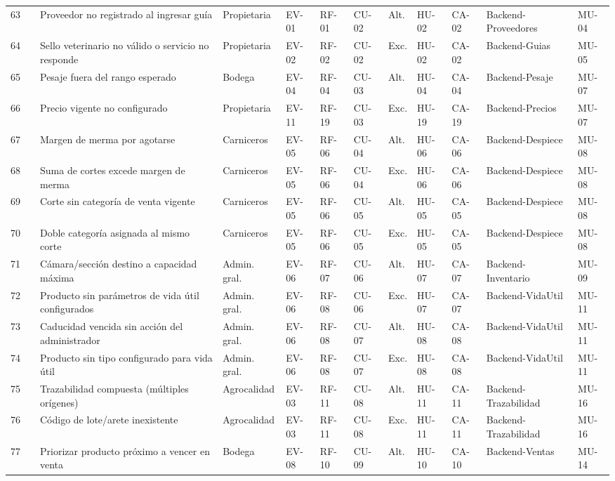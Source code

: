 \documentclass[11pt,a4paper]{article}
\begin{document}
\begin{longtable}{|p{0.3cm}|p{1.0cm}|p{1.9cm}|p{1.3cm}|p{0.6cm}|p{0.7cm}|p{0.6cm}|p{1.1cm}|p{0.6cm}|p{0.6cm}|p{2.0cm}|p{0.8cm}|}
63 &  & Proveedor no registrado al ingresar guía & Propietaria & EV-01 & RF-01 & CU-02 & Alt. & HU-02 & CA-02 & Backend-Proveedores & MU-04 \\
64 &  & Sello veterinario no válido o servicio no responde & Propietaria & EV-02 & RF-02 & CU-02 & Exc. & HU-02 & CA-02 & Backend-Guias & MU-05 \\
65 &  & Pesaje fuera del rango esperado & Bodega & EV-04 & RF-04 & CU-03 & Alt. & HU-04 & CA-04 & Backend-Pesaje & MU-07 \\
66 &  & Precio vigente no configurado & Propietaria & EV-11 & RF-19 & CU-03 & Exc. & HU-19 & CA-19 & Backend-Precios & MU-07 \\
67 &  & Margen de merma por agotarse & Carniceros & EV-05 & RF-06 & CU-04 & Alt. & HU-06 & CA-06 & Backend-Despiece & MU-08 \\
68 &  & Suma de cortes excede margen de merma & Carniceros & EV-05 & RF-06 & CU-04 & Exc. & HU-06 & CA-06 & Backend-Despiece & MU-08 \\
69 &  & Corte sin categoría de venta vigente & Carniceros & EV-05 & RF-06 & CU-05 & Alt. & HU-05 & CA-05 & Backend-Despiece & MU-08 \\
70 &  & Doble categoría asignada al mismo corte & Carniceros & EV-05 & RF-06 & CU-05 & Exc. & HU-05 & CA-05 & Backend-Despiece & MU-08 \\
71 &  & Cámara/sección destino a capacidad máxima & Admin. gral. & EV-06 & RF-07 & CU-06 & Alt. & HU-07 & CA-07 & Backend-Inventario & MU-09 \\
72 &  & Producto sin parámetros de vida útil configurados & Admin. gral. & EV-06 & RF-08 & CU-06 & Exc. & HU-07 & CA-07 & Backend-VidaUtil & MU-11 \\
73 &  & Caducidad vencida sin acción del administrador & Admin. gral. & EV-06 & RF-08 & CU-07 & Alt. & HU-08 & CA-08 & Backend-VidaUtil & MU-11 \\
74 &  & Producto sin tipo configurado para vida útil & Admin. gral. & EV-06 & RF-08 & CU-07 & Exc. & HU-08 & CA-08 & Backend-VidaUtil & MU-11 \\
75 &  & Trazabilidad compuesta (múltiples orígenes) & Agrocalidad & EV-03 & RF-11 & CU-08 & Alt. & HU-11 & CA-11 & Backend-Trazabilidad & MU-16 \\
76 &  & Código de lote/arete inexistente & Agrocalidad & EV-03 & RF-11 & CU-08 & Exc. & HU-11 & CA-11 & Backend-Trazabilidad & MU-16 \\
77 &  & Priorizar producto próximo a vencer en venta & Bodega & EV-08 & RF-10 & CU-09 & Alt. & HU-10 & CA-10 & Backend-Ventas & MU-14 \\

\end{longtable}
\end{document}
